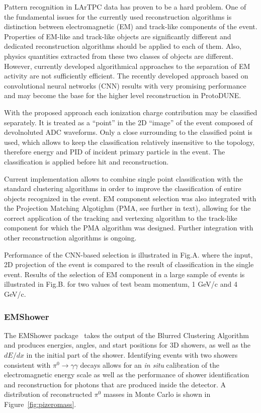 Pattern recognition in LArTPC data has proven to be a hard problem. One of the
fundamental issues for the currently used reconstruction algorithms is distinction
between electromagnetic (EM) and track-like components of the event. Properties of
EM-like and track-like objects are significantly different and dedicated
reconstruction algorithms should be applied to each of them. Also, physics
quantities extracted from these two classes of objects are different. However,
currently developed algorithmical approaches to the separation of EM activity are
not sufficiently efficient. The recently developed approach based on convolutional
neural networks (CNN) results with very promising performance and may become the
base for the higher level reconstruction in ProtoDUNE.

With the proposed approach each ionization charge contribution may be classified
separately. It is treated as a “point” in the 2D “image” of the event composed of
devolnoluted ADC waveforms. Only a close surrounding to the classified point is used,
which allows to keep the classification relatively insensitive to the topology,
therefore energy and PID of incident primary particle in the event. The classification
is applied before hit and reconstruction.

Current implementation allows to combine single point classification with the standard
clustering algorithms in order to improve the classification of entire objects
recognized in the event. EM component selection was also integrated with the Projection
Matching Algotighm (PMA, see further in text), allowing for the correct application of
the tracking and vertexing algorithm to the track-like component for which the PMA
algorithm was designed. Further integration with other reconstruction algorithms is
ongoing.

Performance of the CNN-based selection is illustrated in Fig.A. where the input, 2D
projection of the event is compared to the result of classification in the single event.
Results of the selection of EM component in a large sample of events is illustrated in
Fig.B. for two values of test beam momentum, 1 GeV/c and 4 GeV/c.


\subsubsection{EMShower}

The EMShower package~\cite{emshowerpackage} takes the output of the
Blurred Clustering Algorithm and
produces energies, angles, and start positions for 3D showers, as
well as the $dE/dx$ in the initial part of the shower.  Identifying
events with two showers consistent with $\pi^0\rightarrow\gamma\gamma$
decays allows for an \textit{in situ} calibration of the electromagnetic
energy scale as well as the performance of shower identification and
reconstruction for photons that are produced inside the detector.  A
distribution of reconstructed $\pi^0$ masses in Monte Carlo is shown
in Figure~\ref{fig:pizeromass}.

